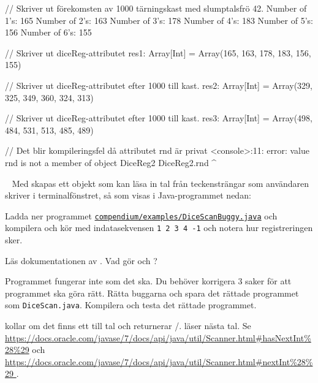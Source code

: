 \SubtaskSolved

\begin{REPL}
  // Skriver ut förekomsten av 1000 tärningskast med slumptalsfrö 42.
Number of 1's: 165
Number of 2's: 163
Number of 3's: 178
Number of 4's: 183
Number of 5's: 156
Number of 6's: 155

  // Skriver ut diceReg-attributet
res1: Array[Int] = Array(165, 163, 178, 183, 156, 155)

  // Skriver ut diceReg-attributet efter 1000 till kast.
res2: Array[Int] = Array(329, 325, 349, 360, 324, 313)

  // Skriver ut diceReg-attributet efter 1000 till kast.
res3: Array[Int] = Array(498, 484, 531, 513, 485, 489)

  // Det blir kompileringsfel då attributet rnd är privat
<console>:11: error: value rnd is not a member of object DiceReg2
	DiceReg2.rnd
				    ^
\end{REPL}

\QUESTEND






\QUESTBEGIN

\Task  \what~  Med  skapas ett objekt som kan läsa in tal från teckensträngar som användaren skriver i terminalfönstret, så som visas i Java-programmet nedan:

Ladda ner programmet   \href{https://raw.githubusercontent.com/lunduniversity/introprog/master/compendium/examples/DiceReg.java}{\texttt{compendium/examples/DiceScanBuggy.java}}
och kompilera och kör med indatasekvensen \texttt{1 2 3 4 -1} och notera hur registreringen sker.

\Subtask Läs dokumentationen av . Vad gör  och ?


\Subtask Programmet fungerar inte som det ska. Du behöver korrigera 3 saker för att programmet ska göra rätt. Rätta buggarna och spara det rättade programmet som \texttt{DiceScan.java}. Kompilera och testa det rättade programmet.

\SOLUTION

\TaskSolved \what

\SubtaskSolved

 kollar om det finns ett till tal och returnerar /.  läser nästa tal.
Se \url{https://docs.oracle.com/javase/7/docs/api/java/util/Scanner.html#hasNextInt%28%29} och \url{https://docs.oracle.com/javase/7/docs/api/java/util/Scanner.html#nextInt%28%29 }.

